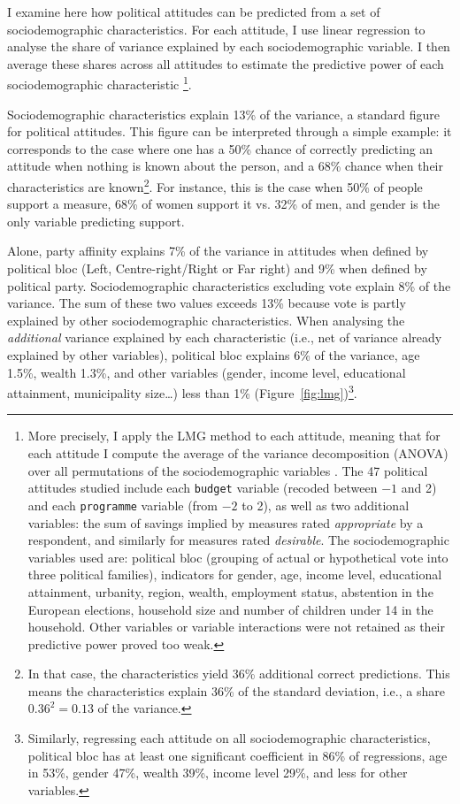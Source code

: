 \documentclass[12pt,english]{article}
\newcommand{\blue}[1]{\textcolor{blue!60!black}{#1}}
\begin{document}
I examine here how political attitudes can be predicted from a set of sociodemographic characteristics. For each attitude, I use linear regression to analyse the share of variance explained by each sociodemographic variable. I then average these shares across all attitudes to estimate the predictive power of each sociodemographic characteristic%
\footnote{More precisely, I apply the LMG method to each attitude, meaning that for each attitude I compute the average of the variance decomposition (ANOVA) over all permutations of the sociodemographic variables \citep{lindeman_introduction_1980,gromping_estimators_2007}. The 47 political attitudes studied include each \texttt{budget} variable (recoded between $-1$ and 2) and each \texttt{programme} variable (from $-2$ to 2), as well as two additional variables: the sum of savings implied by measures rated \textit{appropriate} by a respondent, and similarly for measures rated \textit{desirable}. The sociodemographic variables used are: political bloc (grouping of actual or hypothetical vote into three political families), indicators for gender, age, income level, educational attainment, urbanity, region, wealth, employment status, abstention in the European elections, household size and number of children under 14 in the household. Other variables or variable interactions were not retained as their predictive power proved too weak.}.

Sociodemographic characteristics explain 13\% of the variance, a standard figure for political attitudes. This figure can be interpreted through a simple example: it corresponds to the case where one has a 50\% chance of correctly predicting an attitude when nothing is known about the person, and a 68\% chance when their characteristics are known\footnote{In that case, the characteristics yield 36\% additional correct predictions. This means the characteristics explain 36\% of the standard deviation, i.e., a share $0.36^2=0.13$ of the variance.}. For instance, this is the case when 50\% of people support a measure, 68\% of women support it vs. 32\% of men, and gender is the only variable predicting support.

Alone, \blue{party affinity explains 7\% of the variance in attitudes when defined by political bloc (Left, Centre-right/Right or Far right)} and 9\% when defined by political party. Sociodemographic characteristics excluding vote explain 8\% of the variance. The sum of these two values exceeds 13\% because vote is partly explained by other sociodemographic characteristics. When analysing the \textit{additional} variance explained by each characteristic (i.e., net of variance already explained by other variables), political bloc explains 6\% of the variance, age 1.5\%, wealth 1.3\%, and other variables (gender, income level, educational attainment, municipality size\dots)
less than 1\% (Figure~\ref{fig:lmg})\footnote{Similarly, regressing each attitude on all sociodemographic characteristics, political bloc has at least one significant coefficient in 86\% of regressions, age in 53\%, gender 47\%, wealth 39\%, income level 29\%, and less for other variables.}.
\end{document}
